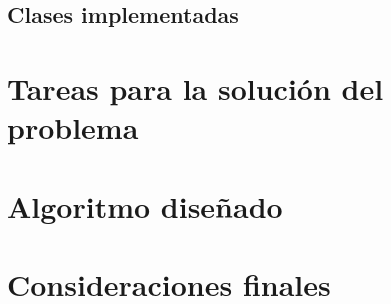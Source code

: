 \documentclass{article}
\begin{document}
\subsection{Clases implementadas}


\section{Tareas para la solución del problema} \label{tareas}

\section{Algoritmo diseñado} \label{algorimo}

\section{Consideraciones finales} \label{consideracionesfinales}
\end{document}
